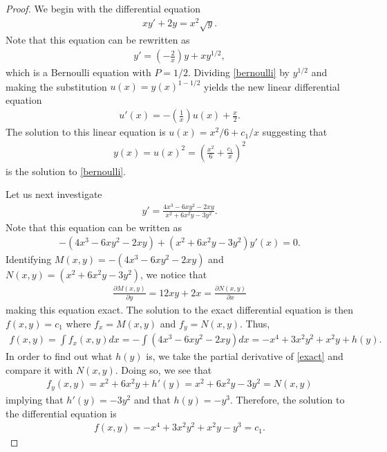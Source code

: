 \documentclass[12pt]{article}
\theoremstyle{definition}
\begin{document}
\begin{proof}
  We begin with the differential equation
  \begin{align*}
    xy' + 2y = x^2\sqrt{y}.
  \end{align*}
  Note that this equation can be rewritten as
  \begin{align}\label{bernoulli}
    y' = \left(-\frac{2}{x}\right) y + x y^{1/2},
  \end{align}
  which is a Bernoulli equation with $P=1/2$. Dividing \eqref{bernoulli} by $y^{1/2}$
  and making the substitution $u(x) = y(x)^{1-1/2}$ yields the new linear differential
  equation
  \begin{align*}
    u'(x) = -\left(\frac{1}{x}\right)u(x) + \frac{x}{2}.
  \end{align*}
  The solution to this linear equation is $u(x) = x^2/6 + c_1/x$ suggesting that
  \begin{align*}
    y(x)=u(x)^2 = \left(\frac{x^2}{6} + \frac{c_1}{x}\right)^2
  \end{align*}
  is the solution to \eqref{bernoulli}.

  Let us next investigate
  \begin{align*}
    y' = \frac{4x^3-6xy^2-2xy}{x^2+6x^2y-3y^2}.
  \end{align*}
  Note that this equation can be written as
  \begin{align*}
   -(4x^3-6xy^2-2xy) +(x^2+6x^2y-3y^2)y'(x) = 0.
  \end{align*}
  Identifying $M(x,y) = -(4x^3-6xy^2-2xy)$ and $N(x,y)=(x^2+6x^2y-3y^2)$, we notice
  that
  \begin{align*}
    \frac{\partial M(x,y)}{\partial y} = 12xy + 2x = \frac{\partial N(x,y)}{\partial x}
  \end{align*}
  making this equation exact.
  The solution to the exact differential equation is then $f(x,y) = c_1$ where
  $f_x = M(x,y)$ and $f_y = N(x,y)$. Thus,
  \begin{align}\label{exact}
    f(x,y) = \int f_x(x,y) dx = -\int (4x^3-6xy^2-2xy) dx = -x^4 +3x^2y^2 +x^2y + h(y).
  \end{align}
  In order to find out what $h(y)$ is, we take the partial derivative of
  \eqref{exact} and compare it with $N(x,y)$. Doing so, we see that
  \begin{align*}
    f_y(x,y) = x^2+6x^2y+h'(y) = x^2+6x^2y-3y^2 = N(x,y)
  \end{align*}
  implying that $h'(y) = -3y^2$ and that $h(y) = -y^3$. Therefore,
  the solution to the differential equation is
  \begin{align*}
    f(x,y) = -x^4 +3x^2y^2 +x^2y -y^3 = c_1.
  \end{align*}


\end{proof}
\end{document}
